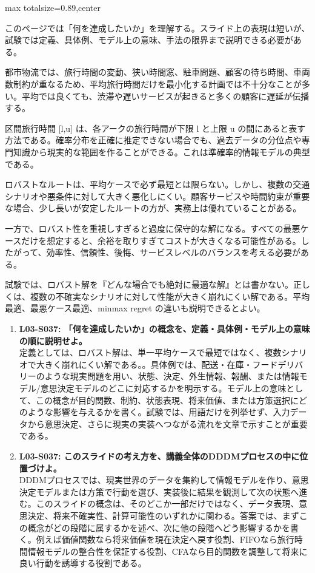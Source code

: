 \begin{minipage}[t]{0.58\textwidth}
\begin{adjustbox}{max totalsize={\textwidth}{0.89\textheight},center}
\begin{minipage}{\textwidth}\scriptsize
{}このページでは「何を達成したいか」を理解する。スライド上の表現は短いが、試験では定義、具体例、モデル上の意味、手法の限界まで説明できる必要がある。\par
都市物流では、旅行時間の変動、狭い時間窓、駐車問題、顧客の待ち時間、車両数制約が重なるため、平均旅行時間だけを最小化する計画では不十分なことが多い。平均では良くても、渋滞や遅いサービスが起きると多くの顧客に遅延が伝播する。\par
区間旅行時間 [l,u] は、各アークの旅行時間が下限 l と上限 u の間にあると表す方法である。確率分布を正確に推定できない場合でも、過去データの分位点や専門知識から現実的な範囲を作ることができる。これは準確率的情報モデルの典型である。\par
ロバストなルートは、平均ケースで必ず最短とは限らない。しかし、複数の交通シナリオや悪条件に対して大きく悪化しにくい。顧客サービスや時間約束が重要な場合、少し長いが安定したルートの方が、実務上は優れていることがある。\par
一方で、ロバスト性を重視しすぎると過度に保守的な解になる。すべての最悪ケースだけを想定すると、余裕を取りすぎてコストが大きくなる可能性がある。したがって、効率性、信頼性、後悔、サービスレベルのバランスを考える必要がある。\par
試験では、ロバスト解を『どんな場合でも絶対に最適な解』とは書かない。正しくは、複数の不確実なシナリオに対して性能が大きく崩れにくい解である。平均最適、最悪ケース最適、minmax regret の違いも説明できるとよい。\par{}\begin{enumerate}\item \textbf{L03-S037: 「何を達成したいか」の概念を、定義・具体例・モデル上の意味の順に説明せよ。}\\定義としては、ロバスト解は、単一平均ケースで最短ではなく、複数シナリオで大きく崩れにくい解である。。具体例では、配送・在庫・フードデリバリーのような現実問題を用い、状態、決定、外生情報、報酬、または情報モデル/意思決定モデルのどこに対応するかを明示する。モデル上の意味として、この概念が目的関数、制約、状態表現、将来価値、または方策選択にどのような影響を与えるかを書く。試験では、用語だけを列挙せず、入力データから意思決定、さらに現実の実装へつながる流れを文章で示すことが重要である。\item \textbf{L03-S037: このスライドの考え方を、講義全体のDDDMプロセスの中に位置づけよ。}\\DDDMプロセスでは、現実世界のデータを集約して情報モデルを作り、意思決定モデルまたは方策で行動を選び、実装後に結果を観測して次の状態へ進む。このスライドの概念は、そのどこか一部だけではなく、データ表現、意思決定、将来不確実性、計算可能性のいずれかに関わる。答案では、まずこの概念がどの段階に属するかを述べ、次に他の段階へどう影響するかを書く。例えば価値関数なら将来価値を現在決定へ戻す役割、FIFOなら旅行時間情報モデルの整合性を保証する役割、CFAなら目的関数を調整して将来に良い行動を誘導する役割である。\end{enumerate}

\end{minipage}
\end{adjustbox}
\end{minipage}
